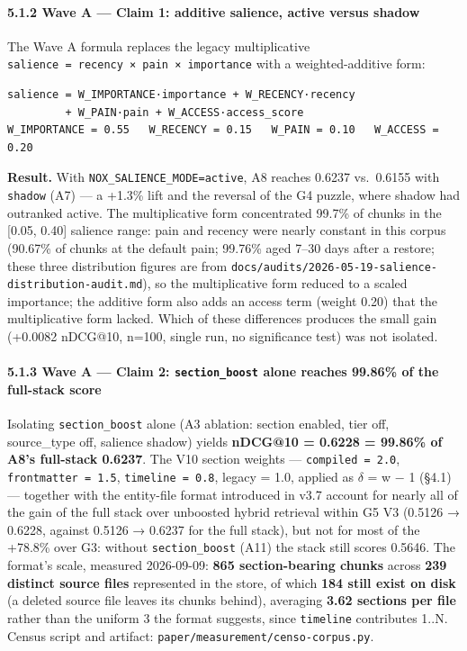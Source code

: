 \documentclass[
]{article}
\begin{document}
\paragraph{5.1.2 Wave A --- Claim 1: additive salience, active versus
shadow}\label{wave-a-claim-1-additive-salience-active-versus-shadow}

The Wave A formula replaces the legacy multiplicative
\texttt{salience\ =\ recency\ ×\ pain\ ×\ importance} with a
weighted-additive form:

\begin{verbatim}
salience = W_IMPORTANCE·importance + W_RECENCY·recency
         + W_PAIN·pain + W_ACCESS·access_score
W_IMPORTANCE = 0.55   W_RECENCY = 0.15   W_PAIN = 0.10   W_ACCESS = 0.20
\end{verbatim}

\textbf{Result.} With \texttt{NOX\_SALIENCE\_MODE=active}, A8 reaches
0.6237 vs.~0.6155 with \texttt{shadow} (A7) --- a +1.3\% lift and the
reversal of the G4 puzzle, where shadow had outranked active. The
multiplicative form concentrated 99.7\% of chunks in the {[}0.05,
0.40{]} salience range: pain and recency were nearly constant in this
corpus (90.67\% of chunks at the default pain; 99.76\% aged 7--30 days
after a restore; these three distribution figures are from
\texttt{docs/audits/2026-05-19-salience-distribution-audit.md}), so the
multiplicative form reduced to a scaled importance; the additive form
also adds an access term (weight 0.20) that the multiplicative form
lacked. Which of these differences produces the small gain (+0.0082
nDCG@10, n=100, single run, no significance test) was not isolated.

\paragraph{\texorpdfstring{5.1.3 Wave A --- Claim 2:
\texttt{section\_boost} alone reaches 99.86\% of the full-stack
score}{5.1.3 Wave A --- Claim 2: section\_boost alone reaches 99.86\% of the full-stack score}}\label{wave-a-claim-2-section_boost-alone-reaches-99.86-of-the-full-stack-score}

Isolating \texttt{section\_boost} alone (A3 ablation: section enabled,
tier off, source\_type off, salience shadow) yields \textbf{nDCG@10 =
0.6228 = 99.86\% of A8's full-stack 0.6237}. The V10 section weights ---
\texttt{compiled\ =\ 2.0}, \texttt{frontmatter\ =\ 1.5},
\texttt{timeline\ =\ 0.8}, legacy = 1.0, applied as \(\delta\) = w − 1
(§4.1) --- together with the entity-file format introduced in v3.7
account for nearly all of the gain of the full stack over unboosted
hybrid retrieval within G5 V3 (0.5126 → 0.6228, against 0.5126 → 0.6237
for the full stack), but not for most of the +78.8\% over G3: without
\texttt{section\_boost} (A11) the stack still scores 0.5646. The
format's scale, measured 2026-09-09: \textbf{865 section-bearing chunks}
across \textbf{239 distinct source files} represented in the store, of
which \textbf{184 still exist on disk} (a deleted source file leaves its
chunks behind), averaging \textbf{3.62 sections per file} rather than
the uniform 3 the format suggests, since \texttt{timeline} contributes
1..N. Census script and artifact:
\texttt{paper/measurement/censo-corpus.py}.
\end{document}
